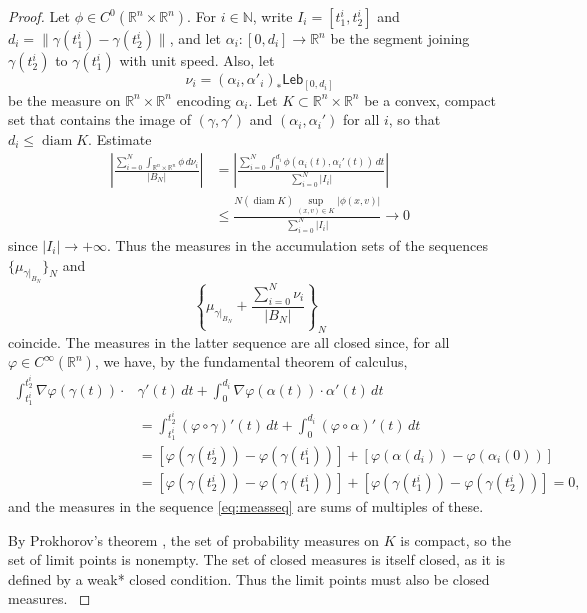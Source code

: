 \documentclass[11pt]{article}
\theoremstyle{definition}
\theoremstyle{remark}
\DeclareMathOperator{\diam}{diam}
\newcommand{\R}{\mathbb{R}}
\newcommand{\N}{\mathbb{N}}
\newcommand{\lebesgue}{\mathsf{Leb}}
\renewcommand{\leq}{\leqslant}
\newcommand{\meas}[2]{\mu_{#1|_{#2}}}
\begin{document}
\begin{proof}
 Let $\phi\in C^0(\R^n\times\R^n)$. For $i\in \N$, write $I_i=[t_1^i,t_2^i]$ and $d_i=\|\gamma(t_1^i)-\gamma(t_2^i)\|$, and let $\alpha_i\colon[0,d_i]\to\R^n$ be the segment joining $\gamma(t_2^i)$ to $\gamma(t_1^i)$ with unit speed. Also, let 
 \[\nu_i=(\alpha_i,\alpha'_i)_*\lebesgue_{[0,d_i]}\] 
 be the measure on $\R^n\times\R^n$ encoding $\alpha_i$. 
 Let $K\subset \R^n\times\R^n$ be a convex, compact set that contains the image of $(\gamma,\gamma')$ and $(\alpha_i,\alpha_i')$ for all $i$, so that $d_i\leq \diam K$. Estimate
 \begin{align*}
  \left|\frac{\sum_{i=0}^N\int_{\R^n\times\R^n} \phi\,d\nu_i}{|B_N|}\right|&=\left|\frac{\sum_{i=0}^N\int_{0}^{d_i} \phi(\alpha_i(t),\alpha_i'(t))\,dt}{\sum_{i=0}^N|I_i|}\right|\\
  &\leq \frac{N(\diam K)\sup_{(x,v)\in K}|\phi(x,v)|}{\sum_{i=0}^N|I_i|}\to 0
 \end{align*}
%
%
%
%
%
 since $|I_i|\to+\infty$. Thus the measures in the accumulation sets of the sequences $\{\meas{\gamma}{B_N}\}_N$ and 
 \begin{equation}\label{eq:measseq}\left\{\meas{\gamma}{B_N}+\frac{\sum_{i=0}^N\nu_i}{|B_N|}\right\}_N\end{equation}
 coincide. The measures in the latter sequence are all closed since, for all $\varphi\in C^\infty(\R^n)$, we have, by the fundamental theorem of calculus,
 \begin{align*}
  \int_{t^i_1}^{t^i_2} \nabla\varphi(\gamma(t))\cdot&\gamma'(t)\,dt+\int_0^{d_i}\nabla\varphi(\alpha(t))\cdot\alpha'(t)\,dt\\
  &=\int_{t_1^i}^{t_2^i} (\varphi\circ\gamma)'(t)\, dt + \int_0^{d_i} (\varphi\circ\alpha)'(t)\,dt
  \\
  &=[\varphi(\gamma(t^i_2))-\varphi(\gamma(t^i_1))]+[\varphi(\alpha(d_i))-\varphi(\alpha_i(0))]
  \\
  &=[\varphi(\gamma(t^i_2))-\varphi(\gamma(t^i_1))]+[\varphi(\gamma(t^i_1))-\varphi(\gamma(t^i_2))]=0,
 \end{align*}
 and the measures in the sequence \eqref{eq:measseq} are sums of multiples of these.
 
 By Prokhorov's theorem \cite{prokhorov}, the set of probability measures on $K$ is compact, so the set of limit points is nonempty.
 The set of closed measures is itself closed, as it is defined by a {weak* closed condition.
 Thus the limit points must also be closed measures.
%
%
%
}\end{proof}
\end{document}
